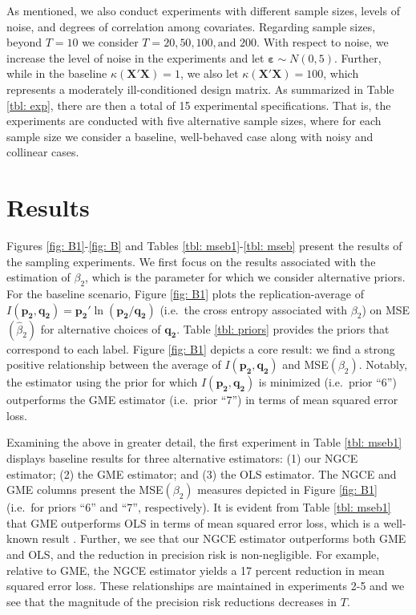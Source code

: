 \documentclass[english]{article}
\begin{document}
As mentioned, we also conduct experiments with different sample sizes, 
levels of noise, and degrees of correlation among covariates.
Regarding sample sizes, beyond $T=10$ we consider $T=20, 50, 100, 
\text{and } 200$. 
With respect to noise, we increase the level of noise in the experiments and 
let $\mathbf{\varepsilon}\sim N(0,5)$.
Further, while in the baseline $\kappa(\mathbf{X}'\mathbf{X})=1$, we
also let $\kappa(\mathbf{X}'\mathbf{X})=100$, which represents a 
moderately ill-conditioned design matrix.
As summarized in Table \ref{tbl: exp}, there are then a total of 15 
experimental specifications. 
That is, the experiments are conducted with five alternative sample sizes, 
where for each sample size we consider a baseline, well-behaved case along
with noisy and collinear cases.


\section{Results}
\label{sec: results}

Figures \ref{fig: B1}-\ref{fig: B} and Tables \ref{tbl: mseb1}-\ref{tbl: mseb} 
present the results of the sampling experiments.
We first focus on the results associated with the estimation of $\beta_2$, which 
is the parameter for which we consider alternative priors.
For the baseline scenario, Figure \ref{fig: B1} plots the replication-average of 
$I(\mathbf{p_2}, \mathbf{q_2}) = \mathbf{p_2}'\ln (\mathbf{p_2}/
\mathbf{q_2})$ (i.e.\ the cross entropy associated with $\beta_2$) on 
MSE$(\hat{\beta}_2)$  for alternative choices of $\mathbf{q_2}$.
Table \ref{tbl: priors} provides the priors that correspond to each label.
Figure \ref{fig: B1} depicts a core result: we find a strong positive 
relationship between the average of $I(\mathbf{p_2}, \mathbf{q_2})$ 
and MSE$(\beta_2)$.
Notably, the estimator using the prior for which $I(\mathbf{p_2}, 
\mathbf{q_2})$ is minimized (i.e.\ prior ``6'') outperforms the GME 
estimator (i.e.\ prior ``7'') in terms of mean squared error loss.

Examining the above in greater detail, the first experiment in Table 
\ref{tbl: mseb1} displays baseline results for three alternative estimators: 
(1) our NGCE estimator; (2) the GME estimator; and (3) the OLS 
estimator.
The NGCE and GME columns present the MSE$(\beta_2)$ measures 
depicted in Figure \ref{fig: B1} (i.e.\ for priors ``6'' and ``7'', respectively).
It is evident from Table \ref{tbl: mseb1} that GME outperforms OLS in 
terms of mean squared error loss, which is a well-known result 
\citep{golan1996}. 
Further, we see that our NGCE estimator outperforms both GME and OLS,
and the reduction in precision risk is non-negligible.
For example, relative to GME, the NGCE estimator yields a 17 percent 
reduction in mean squared error loss.
These relationships are maintained in experiments 2-5 and we see that 
the magnitude of the precision risk reductions decreases in $T$.
\end{document}
